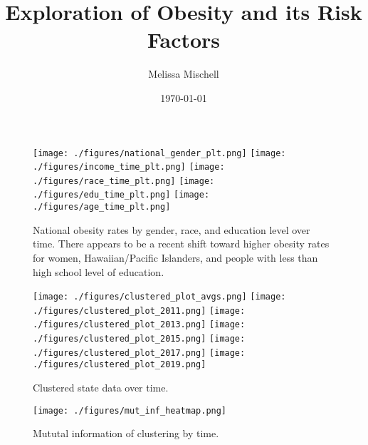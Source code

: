 \documentclass[11pt]{article}
\title{Exploration of Obesity and its Risk Factors}
\author{Melissa Mischell}
\date{\today}
\begin{document}
\maketitle

\begin{figure}[hp]
\texttt{[image: ./figures/national\_gender\_plt.png]}
\texttt{[image: ./figures/income\_time\_plt.png]}
\texttt{[image: ./figures/race\_time\_plt.png]}
\texttt{[image: ./figures/edu\_time\_plt.png]}
\texttt{[image: ./figures/age\_time\_plt.png]}
\caption{
  National obesity rates by gender, race, and education level over time. There appears to be a recent shift toward higher obesity rates for women, Hawaiian/Pacific Islanders, and people with less than high school level of education. 
}
\label{fig:dems_by_time}
\end{figure}

\begin{figure}[hp]
\texttt{[image: ./figures/clustered\_plot\_avgs.png]}
\texttt{[image: ./figures/clustered\_plot\_2011.png]}
\texttt{[image: ./figures/clustered\_plot\_2013.png]}
\texttt{[image: ./figures/clustered\_plot\_2015.png]}
\texttt{[image: ./figures/clustered\_plot\_2017.png]}
\texttt{[image: ./figures/clustered\_plot\_2019.png]}
\caption{
  Clustered state data over time.
}
\label{fig:clustered_data}
\end{figure}

\begin{figure}[hp]
\texttt{[image: ./figures/mut\_inf\_heatmap.png]}
\caption{
  Mututal information of clustering by time. 
}
\label{fig:mut_inf}
\end{figure}
\end{document}
